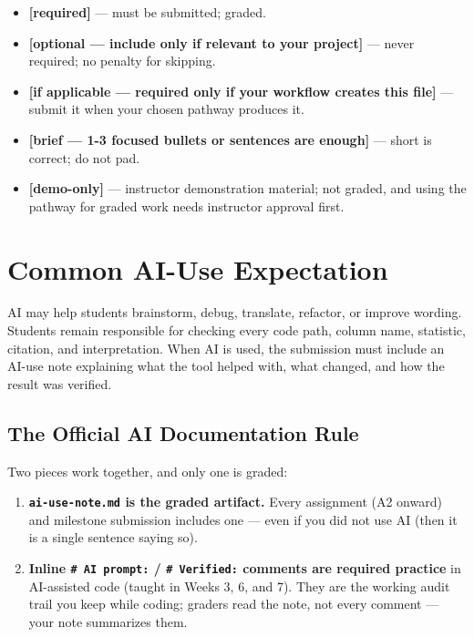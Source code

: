 \documentclass[
  letterpaper,
  DIV=11,
  numbers=noendperiod,
  oneside]{scrreprt}
\providecommand{\tightlist}{%
  \setlength{\itemsep}{0pt}\setlength{\parskip}{0pt}}
\begin{document}
\begin{itemize}
\tightlist
\item
  \textbf{{[}required{]}} --- must be submitted; graded.
\item
  \textbf{{[}optional --- include only if relevant to your project{]}}
  --- never required; no penalty for skipping.
\item
  \textbf{{[}if applicable --- required only if your workflow creates
  this file{]}} --- submit it when your chosen pathway produces it.
\item
  \textbf{{[}brief --- 1-3 focused bullets or sentences are enough{]}}
  --- short is correct; do not pad.
\item
  \textbf{{[}demo-only{]}} --- instructor demonstration material; not
  graded, and using the pathway for graded work needs instructor
  approval first.
\end{itemize}

\section*{Common AI-Use Expectation}\label{common-ai-use-expectation}


AI may help students brainstorm, debug, translate, refactor, or improve
wording. Students remain responsible for checking every code path,
column name, statistic, citation, and interpretation. When AI is used,
the submission must include an AI-use note explaining what the tool
helped with, what changed, and how the result was verified.

\subsection*{The Official AI Documentation
Rule}\label{the-official-ai-documentation-rule}

Two pieces work together, and only one is graded:

\begin{enumerate}
\def\labelenumi{\arabic{enumi}.}
\tightlist
\item
  \textbf{\texttt{ai-use-note.md} is the graded artifact.} Every
  assignment (A2 onward) and milestone submission includes one --- even
  if you did not use AI (then it is a single sentence saying so).
\item
  \textbf{Inline \texttt{\#\ AI\ prompt:} / \texttt{\#\ Verified:}
  comments are required practice} in AI-assisted code (taught in Weeks
  3, 6, and 7). They are the working audit trail you keep while coding;
  graders read the note, not every comment --- your note summarizes
  them.
\end{enumerate}
\end{document}
